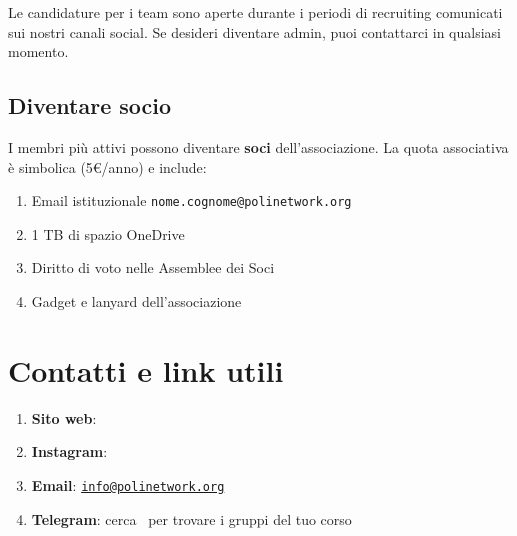 \documentclass[letter]{polinetwork}
\begin{document}
Le candidature per i team sono aperte durante i periodi di
recruiting comunicati sui nostri canali social. Se desideri
diventare admin, puoi contattarci in qualsiasi momento.

\subsection{Diventare socio}

I membri più attivi possono diventare \textbf{soci} dell'associazione.
La quota associativa è simbolica (5\euro{}/anno) e include:
\begin{enumerate}[leftmargin=2em]
	\item Email istituzionale \texttt{nome.cognome@polinetwork.org}
	\item 1 TB di spazio OneDrive
	\item Diritto di voto nelle Assemblee dei Soci
	\item Gadget e lanyard dell'associazione
\end{enumerate}

\section{Contatti e link utili}

\begin{enumerate}[leftmargin=2em]
	\item \textbf{Sito web}: \pnWebsiteLink
	\item \textbf{Instagram}: \pnInstagramLink
	\item \textbf{Email}: \href{mailto:info@polinetwork.org}{\textcolor{pn-primary}{\texttt{info@polinetwork.org}}}
	\item \textbf{Telegram}: cerca \pnTelegramLink\ per
	      trovare i gruppi del tuo corso
\end{enumerate}
\end{document}
